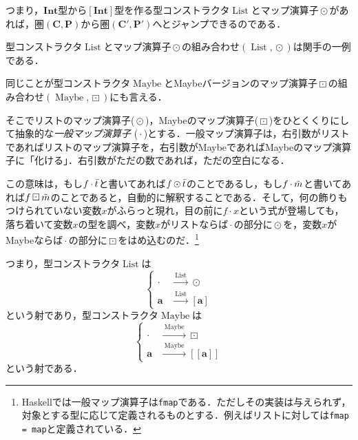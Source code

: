 \documentclass[twocolumn]{jsbook}
\def\[{[\![}
\def\]{]\!]}
\newcommand{\keyword}[1]{{\emph{#1}}}
\newcommand{\code}[1]{\texttt{#1}}
\newcommand{\hsklType}[1]{\textbf{#1}}
\newcommand{\hsklTypeConstructor}[1]{\mathop{\mathrm{#1}}}
\DeclareMathOperator{\hsklFmap}{\cdot}
\DeclareMathOperator{\hsklListConstructor}{\hsklTypeConstructor{List}}
\DeclareMathOperator{\hsklMap}{\odot}
\DeclareMathOperator{\hsklMaybeConstructor}{\hsklTypeConstructor{Maybe}}
\DeclareMathOperator{\hsklMaybeMap}{\boxdot}
\newcommand{\hsklInt}{\hsklType{Int}}
\newcommand{\hsklList}[1]{\Bar{#1}}
\newcommand{\hsklListType}[1]{[#1]}
\newcommand{\hsklMaybe}[1]{\Tilde{#1}}
\newcommand{\hsklMaybeType}[1]{\[#1\]}
\newcommand{\mathSet}[1]{\mathbf{#1}}
\newcommand{\mathCategoryShort}[2]{(#1,#2)}
\begin{document}
つまり，$\hsklInt$型から$\hsklListType{\hsklInt}$型を作る型コンストラクタ$\hsklListConstructor$とマップ演算子$\hsklMap$があれば，圏$\mathCategoryShort{\mathSet{C}}{\mathSet{P}}$から圏$\mathCategoryShort{\mathSet{C}'}{\mathSet{P}'}$へとジャンプできるのである．

型コンストラクタ$\hsklListConstructor$とマップ演算子$\hsklMap$の組み合わせ$(\hsklListConstructor,\hsklMap)$は関手の一例である．

同じことが型コンストラクタ$\hsklMaybeConstructor$とMaybeバージョンのマップ演算子$\hsklMaybeMap$の組み合わせ$(\hsklMaybeConstructor,\hsklMaybeMap)$にも言える．

そこでリストのマップ演算子($\hsklMap$)，Maybeのマップ演算子($\hsklMaybeMap$)をひとくくりにして抽象的な\keyword{一般マップ演算子} ($\hsklFmap$)とする．一般マップ演算子は，右引数がリストであればリストのマップ演算子を，右引数がMaybeであればMaybeのマップ演算子に「化ける」．右引数がただの数であれば，ただの空白になる．

この意味は，もし$f\hsklFmap\hsklList{t}$と書いてあれば$f\hsklMap\hsklList{t}$のことであるし，もし$f\hsklFmap\hsklMaybe{m}$と書いてあれば$f\hsklMaybeMap\hsklMaybe{m}$のことであると，自動的に解釈することである．そして，何の飾りもつけられていない変数$x$がふらっと現れ，目の前に$f\hsklFmap x$という式が登場しても，落ち着いて変数$x$の型を調べ，変数$x$がリストならば$\hsklFmap$の部分に$\hsklMap$を，変数$x$がMaybeならば$\hsklFmap$の部分に$\hsklMaybeMap$をはめ込むのだ．\footnote{Haskellでは一般マップ演算子は\code{fmap}である．ただしその実装は与えられず，対象とする型に応じて定義されるものとする．例えばリストに対しては\code{fmap = map}と定義されている．}

つまり，型コンストラクタ$\hsklTypeConstructor{List}$は
\begin{equation*}
\left\{
\begin{split}
\hsklFmap&\xrightarrow{\;\hsklTypeConstructor{List}\;}\hsklMap\\
\hsklType{a}&\xrightarrow{\;\hsklTypeConstructor{List}\;}\hsklListType{\hsklType{a}}
\end{split}
\right.
\end{equation*}
という射であり，型コンストラクタ$\hsklTypeConstructor{Maybe}$は
\begin{equation*}
\left\{
\begin{split}
\hsklFmap&\xrightarrow{\;\hsklTypeConstructor{Maybe}\;}\hsklMaybeMap\\
\hsklType{a}&\xrightarrow{\;\hsklTypeConstructor{Maybe}\;}\hsklMaybeType{\hsklType{a}}
\end{split}
\right.
\end{equation*}
という射である．
\end{document}
